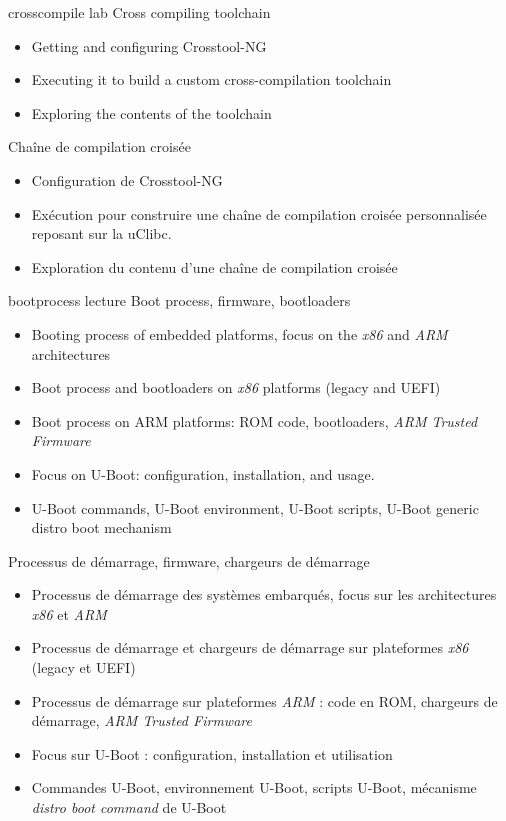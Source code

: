 {crosscompile}
{lab}
{Cross compiling toolchain}
{
  \begin{itemize}
  \item Getting and configuring Crosstool-NG
  \item Executing it to build a custom cross-compilation toolchain
  \item Exploring the contents of the toolchain
  \end{itemize}
}
{Chaîne de compilation croisée}
{
  \begin{itemize}
  \item Configuration de Crosstool-NG
  \item Exécution pour construire une chaîne de compilation croisée
    personnalisée reposant sur la uClibc.
  \item Exploration du contenu d'une chaîne de compilation croisée
  \end{itemize}
}
{bootprocess}
{lecture}
{Boot process, firmware, bootloaders}
{
  \begin{itemize}
  \item Booting process of embedded platforms, focus on the {\em x86}
    and {\em ARM} architectures
  \item Boot process and bootloaders on {\em x86} platforms (legacy
    and UEFI)
  \item Boot process on ARM platforms: ROM code, bootloaders, {\em ARM
      Trusted Firmware}
  \item Focus on U-Boot: configuration, installation, and usage.
  \item U-Boot commands, U-Boot environment, U-Boot scripts, U-Boot
    generic distro boot mechanism
  \end{itemize}
}
{Processus de démarrage, firmware, chargeurs de démarrage}
{
  \begin{itemize}
  \item Processus de démarrage des systèmes embarqués, focus sur les
    architectures {\em x86} et {\em ARM}
  \item Processus de démarrage et chargeurs de démarrage sur
    plateformes {\em x86} (legacy et UEFI)
  \item Processus de démarrage sur plateformes {\em ARM} : code en ROM,
    chargeurs de démarrage, {\em ARM Trusted Firmware}
  \item Focus sur U-Boot : configuration, installation et utilisation
  \item Commandes U-Boot, environnement U-Boot, scripts U-Boot,
    mécanisme {\em distro boot command} de U-Boot
  \end{itemize}
}
